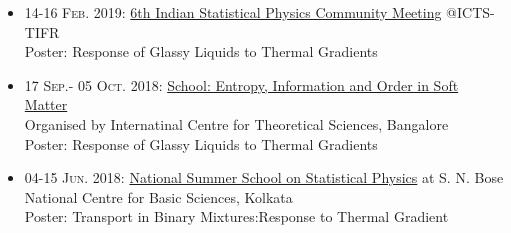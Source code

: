 \begin{small}
\begin{itemize}
\item \textsc{14-16 Feb. 2019: } {\href{https://www.icts.res.in/discussion-meeting/ispcm2019} {6th Indian Statistical Physics Community Meeting}} @ICTS-TIFR\\
\footnotesize{Poster: Response of Glassy Liquids to Thermal Gradients}

\item \textsc{17 Sep.- 05 Oct. 2018: } {\href{https://www.icts.res.in/event/page/14933} {School: Entropy, Information and Order in Soft Matter}}\\
\footnotesize{Organised by Internatinal Centre for Theoretical Sciences, Bangalore }\\
\footnotesize{Poster: Response of Glassy Liquids to Thermal Gradients}

\item \textsc{04-15 Jun. 2018: } {\href{http://newweb.bose.res.in/Conferences/NSS2018/}{National Summer School on Statistical Physics}} at  S. N. Bose National Centre for Basic Sciences, Kolkata\\
 \footnotesize{Poster: Transport in Binary Mixtures:Response to Thermal Gradient}

\end{itemize}
\end{small}